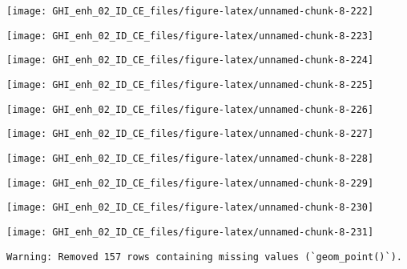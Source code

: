 \documentclass[
  10pt,
  a4paper,oneside]{article}
\begin{document}
\begin{center}\texttt{[image: GHI\_enh\_02\_ID\_CE\_files/figure-latex/unnamed-chunk-8-222]} \end{center}

\begin{center}\texttt{[image: GHI\_enh\_02\_ID\_CE\_files/figure-latex/unnamed-chunk-8-223]} \end{center}

\begin{center}\texttt{[image: GHI\_enh\_02\_ID\_CE\_files/figure-latex/unnamed-chunk-8-224]} \end{center}

\begin{center}\texttt{[image: GHI\_enh\_02\_ID\_CE\_files/figure-latex/unnamed-chunk-8-225]} \end{center}

\begin{center}\texttt{[image: GHI\_enh\_02\_ID\_CE\_files/figure-latex/unnamed-chunk-8-226]} \end{center}

\begin{center}\texttt{[image: GHI\_enh\_02\_ID\_CE\_files/figure-latex/unnamed-chunk-8-227]} \end{center}

\begin{center}\texttt{[image: GHI\_enh\_02\_ID\_CE\_files/figure-latex/unnamed-chunk-8-228]} \end{center}

\begin{center}\texttt{[image: GHI\_enh\_02\_ID\_CE\_files/figure-latex/unnamed-chunk-8-229]} \end{center}

\begin{center}\texttt{[image: GHI\_enh\_02\_ID\_CE\_files/figure-latex/unnamed-chunk-8-230]} \end{center}

\begin{center}\texttt{[image: GHI\_enh\_02\_ID\_CE\_files/figure-latex/unnamed-chunk-8-231]} \end{center}

\begin{verbatim}
Warning: Removed 157 rows containing missing values (`geom_point()`).
\end{verbatim}
\end{document}
